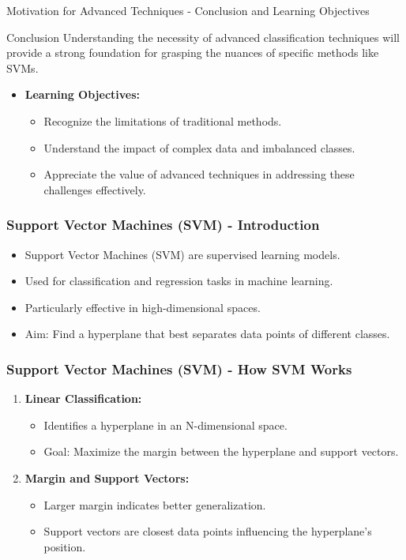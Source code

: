 \documentclass[aspectratio=169]{beamer}
\begin{document}
\begin{frame}[fragile]{Motivation for Advanced Techniques - Conclusion and Learning Objectives}
    \begin{block}{Conclusion}
        Understanding the necessity of advanced classification techniques will provide a strong foundation for grasping the nuances of specific methods like SVMs.
    \end{block}
    \begin{itemize}
        \item \textbf{Learning Objectives:}
            \begin{itemize}
                \item Recognize the limitations of traditional methods.
                \item Understand the impact of complex data and imbalanced classes.
                \item Appreciate the value of advanced techniques in addressing these challenges effectively.
            \end{itemize}
    \end{itemize}
\end{frame}

\begin{frame}[fragile]
    \frametitle{Support Vector Machines (SVM) - Introduction}
    \begin{itemize}
        \item Support Vector Machines (SVM) are supervised learning models.
        \item Used for classification and regression tasks in machine learning.
        \item Particularly effective in high-dimensional spaces.
        \item Aim: Find a hyperplane that best separates data points of different classes.
    \end{itemize}
\end{frame}

\begin{frame}[fragile]
    \frametitle{Support Vector Machines (SVM) - How SVM Works}
    \begin{enumerate}
        \item \textbf{Linear Classification:} 
        \begin{itemize}
            \item Identifies a hyperplane in an N-dimensional space.
            \item Goal: Maximize the margin between the hyperplane and support vectors.
        \end{itemize}
        
        \item \textbf{Margin and Support Vectors:} 
        \begin{itemize}
            \item Larger margin indicates better generalization.
            \item Support vectors are closest data points influencing the hyperplane's position.
        \end{itemize}
    \end{enumerate}
\end{frame}
\end{document}
